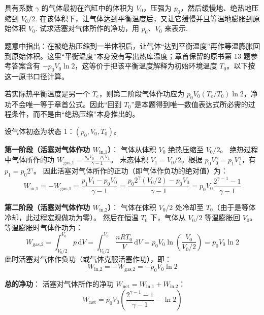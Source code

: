 \begin{exercise}\label{ex:11.13}
具有系数 $\gamma$ 的气体最初在汽缸中的体积为 $V_0$，压强为 $p_0$，然后缓慢地、绝热地压缩到 $V_0/2$. 在该体积下，让气体达到平衡温度后，又让它缓慢并且等温地膨胀到原始体积 $V_0$. 试求活塞对气体所作的净功，用 $p_0$、$V_0$ 来表示.
\end{exercise}
\begin{solution}
题意中指出：在被绝热压缩到一半体积后，让气体“达到平衡温度”再作等温膨胀回到原始体积。这里“平衡温度”本身没有写出热库温度；章首保留的原书第 13 题参考答案含有 $-p_0V_0\ln2$，这等价于把该平衡温度解释为初始环境温度 $T_0$。以下按这一原书口径计算。

若实际热平衡温度是另一个 $T_e$，则第二阶段气体作功应为 $p_0V_0(T_e/T_0)\ln2$，净功不会唯一等于章首公式。因此“回到 $T_0$”是本题得到唯一数值表达式所必需的过程条件，而不是由“绝热压缩”本身推出的。

设气体初态为状态 1：$(p_0, V_0, T_0)$。

\textbf{第一阶段（活塞对气体作功 $W_{\text{in,1}}$）}：
气体从体积 $V_0$ 绝热压缩至 $V_0/2$。
绝热过程中气体所作的功 $W_{\text{gas,1}} = \frac{p_0 V_0 - p_1 V_1}{\gamma - 1}$。
末态体积 $V_1 = V_0/2$。根据 $p_0 V_0^\gamma = p_1 V_1^\gamma$，有 $p_1 = p_0 2^\gamma$。
因此活塞对气体所作的正功（即气体作负功的绝对值）为：
$$ W_{\text{in,1}} = - W_{\text{gas,1}} = \frac{p_1 V_1 - p_0 V_0}{\gamma - 1} = \frac{p_0 2^\gamma (V_0/2) - p_0 V_0}{\gamma - 1} = p_0 V_0 \frac{2^{\gamma-1} - 1}{\gamma - 1} $$

\textbf{第二阶段（活塞对气体作功 $W_{\text{in,2}}$）}：
气体在体积 $V_0/2$ 处冷却至 $T_0$（由于是等体冷却，此过程宏观做功为零）。
然后在恒温 $T_0$ 下，气体从 $V_0/2$ 等温膨胀回 $V_0$。
等温膨胀时气体作功为：
$$ W_{\text{gas,2}} = \int_{V_0/2}^{V_0} p \, \mathrm{d}V = \int_{V_0/2}^{V_0} \frac{n R T_0}{V} \, \mathrm{d}V = p_0 V_0 \ln\left( \frac{V_0}{V_0/2} \right) = p_0 V_0 \ln 2 $$
此时活塞对气体作负功（或气体克服活塞作功），即：
$$ W_{\text{in,2}} = - W_{\text{gas,2}} = - p_0 V_0 \ln 2 $$

\textbf{总的净功}：
活塞对气体所作的净功 $W_{\text{net}} = W_{\text{in,1}} + W_{\text{in,2}}$：
$$ W_{\text{net}} = p_0 V_0 \left( \frac{2^{\gamma - 1} - 1}{\gamma - 1} - \ln 2 \right) $$
\end{solution}

